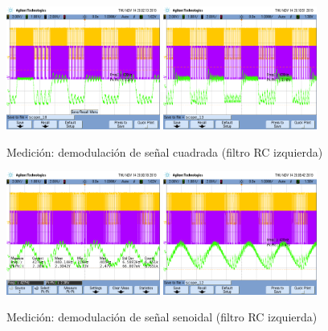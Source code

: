 \begin{figure}[H]
    \centering
    \includegraphics[width=0.45\textwidth]{../Ex2/resources/demodulacionfmcuadradarc.png}
    \includegraphics[width=0.45\textwidth]{../Ex2/resources/demodulacionfmcuadradarrc.png}
    \caption{Medición: demodulación de señal cuadrada (filtro RC izquierda)}
    \label{demodulacionfmcuadrada}
\end{figure}
\begin{figure}[H]
    \centering
    \includegraphics[width=0.45\textwidth]{../Ex2/resources/demodulacionfmsenoidalrc.png}
    \includegraphics[width=0.45\textwidth]{../Ex2/resources/demodulacionfmsenoidalrrc.png}
    \caption{Medición: demodulación de señal senoidal (filtro RC izquierda)}
    \label{demodulacionfmsenoidal}
\end{figure}
